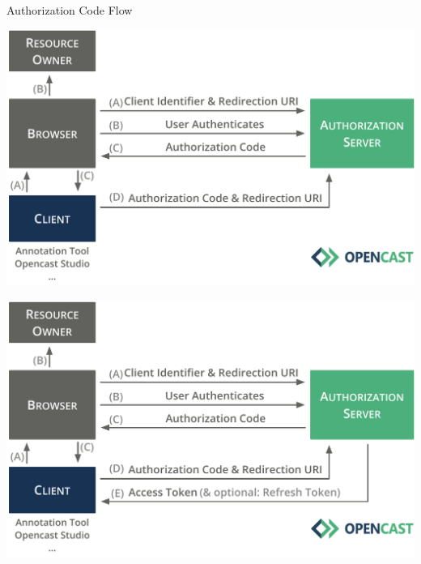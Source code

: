 \documentclass[aspectratio=169]{beamer}
\begin{document}
\begin{frame}{Authorization Code Flow}
	\vspace*{0.5em}
	\begin{overprint}
		\centerline{\includegraphics[height=0.84\textheight]{figures/authorization-code-flow-05}}
		\centerline{\includegraphics[height=0.84\textheight]{figures/authorization-code-flow-06}}
	\end{overprint}
	\vspace{-2em}
\end{frame}
\end{document}
